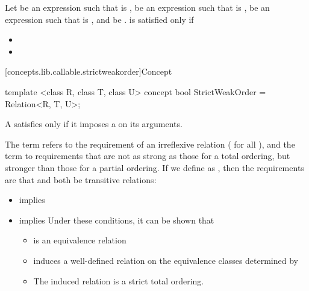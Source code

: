 \begin{itemdescr}
\pnum
Let  be an expression such that  is ,
 be an expression such that  is ,
 be an expression such that  is ,
and  be .
 is satisfied only if

\begin{itemize}
\item {}
\item {}
\end{itemize}
\end{itemdescr}

[concepts.lib.callable.strictweakorder]{Concept }

%
\begin{itemdecl}
template <class R, class T, class U>
concept bool StrictWeakOrder = Relation<R, T, U>;
\end{itemdecl}

\begin{itemdescr}
\pnum
A  satisfies  only if
it imposes a  on its arguments.

\pnum
The term
refers to the
requirement of an irreflexive relation ( for all ),
and the term
to requirements that are not as strong as
those for a total ordering,
but stronger than those for a partial
ordering.
If we define
as
,
then the requirements are that
and
both be transitive  relations:

\begin{itemize}
\item
{}
implies
\item
{}
implies
\enternote
Under these conditions, it can be shown that
\begin{itemize}
\item
{}
is an equivalence relation
\item
{}
induces a well-defined relation on the equivalence
classes determined by
\item
The induced relation is a strict total ordering.
\exitnote
\end{itemize}
\end{itemize}
\end{itemdescr}
